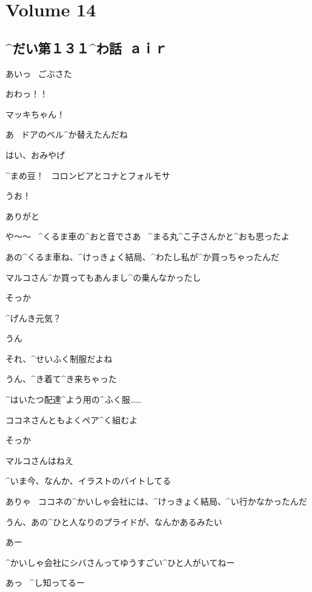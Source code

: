 \section{Volume 14}

\subsection{^{だい}{第}１３１^{わ}{話}\ ａｉｒ}

\page[6]
\Makki あいっ
\ ごぶさた

\Alpha おわっ！！

\Alpha マッキちゃん！

\Makki あ
\ ドアのベル^{か}{替}えたんだね

\page[7]
\Makki はい、おみやげ

\Makki ^{まめ}{豆}！
\ コロンビアとコナとフォルモサ

\Alpha うお！

\Alpha ありがと

\Alpha や〜〜
\ ^{くるま}{車}の^{おと}{音}でさあ
\ ^{まる}{丸}^{こ}{子}さんかと^{おも}{思}ったよ

\Makki あの^{くるま}{車}ね、^{けっきょく}{結局}、^{わたし}{私}が^{か}{買}っちゃったんだ

\Makki マルコさん^{か}{買}ってもあんまし^{の}{乗}んなかったし

\Alpha そっか

\Alpha ^{げんき}{元気}？

\Makki うん

\page[8]
\Alpha それ、^{せいふく}{制服}だよね

\Makki うん、^{き}{着}て^{き}{来}ちゃった

\Makki ^{はいたつ}{配達}^{よう}{用}の^{ふく}{服}……

\Makki ココネさんともよくペア^{く}{組}むよ

\Alpha そっか

\page[9]
\Makki マルコさんはねえ

\Makki ^{いま}{今}、なんか、イラストのバイトしてる

\Alpha ありゃ
\ ココネの^{かいしゃ}{会社}には、^{けっきょく}{結局}、^{い}{行}かなかったんだ

\Makki うん、あの^{ひと}{人}なりのプライドが、なんかあるみたい

\Alpha あー

\Makki ^{かいしゃ}{会社}にシバさんってゆうすごい^{ひと}{人}がいてねー

\Alpha あっ
\ ^{し}{知}ってるー

